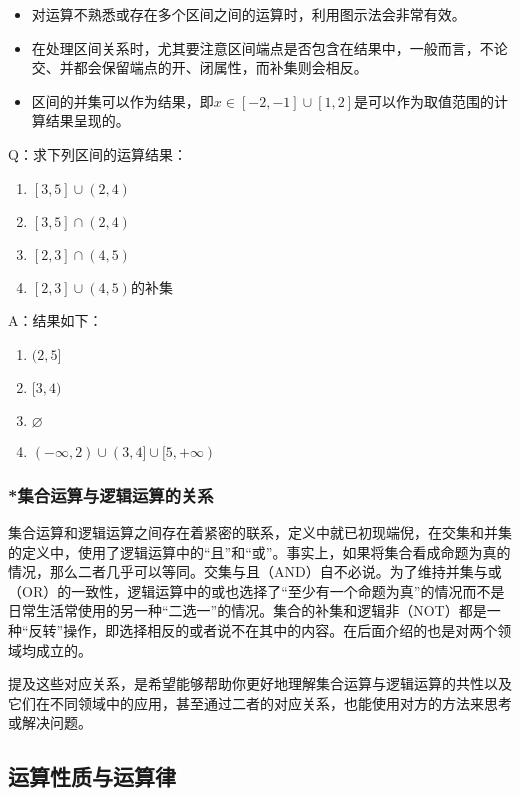 \begin{itemize}
\item 对运算不熟悉或存在多个区间之间的运算时，利用图示法会非常有效。
\item 在处理区间关系时，尤其要注意区间端点是否包含在结果中，一般而言，不论交、并都会保留端点的开、闭属性，而补集则会相反。
\item 区间的并集可以作为结果，即$x\in[-2,-1]\cup[1,2]$是可以作为取值范围的计算结果呈现的。
\end{itemize}
\begin{exercise}{}
Q：求下列区间的运算结果：
\begin{enumerate}
\item $[3,5]\cup(2,4)$
\item $[3,5]\cap(2,4)$
\item $[2,3]\cap(4,5)$
\item $[2,3]\cup(4,5)$的补集
\end{enumerate}
A：结果如下：
\begin{enumerate}
\item $(2,5]$
\item $[3,4)$
\item $\varnothing$
\item $(-\infty,2)\cup(3,4]\cup[5,+\infty)$
\end{enumerate}
\end{exercise}

\subsubsection{*集合运算与逻辑运算的关系}

集合运算和逻辑运算之间存在着紧密的联系，定义中就已初现端倪，在交集和并集的定义中，使用了逻辑运算中的“且”和“或”。事实上，如果将集合看成命题为真的情况，那么二者几乎可以等同。交集与且（AND）自不必说。为了维持并集与或（OR）的一致性，逻辑运算中的或也选择了“至少有一个命题为真”的情况而不是日常生活常使用的另一种“二选一”的情况。集合的补集和逻辑非（NOT）都是一种“反转”操作，即选择相反的或者说不在其中的内容。在后面介绍的也是对两个领域均成立的。

提及这些对应关系，是希望能够帮助你更好地理解集合运算与逻辑运算的共性以及它们在不同领域中的应用，甚至通过二者的对应关系，也能使用对方的方法来思考或解决问题。

\subsection{运算性质与运算律}



